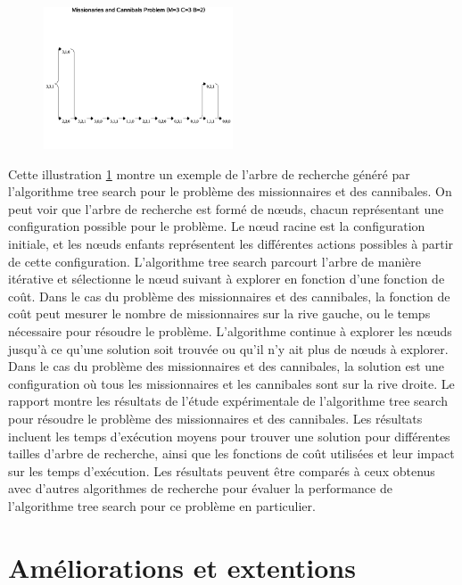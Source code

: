 \documentclass{article}
\begin{document}
\begin{figure}[h]
\centering
\includegraphics[width=0.5\textwidth]{tree_search_example.png}
\label{fig:tree_search_example}
\end{figure}

\noindent Cette illustration \ref{fig:tree_search_example} montre un exemple de l'arbre de recherche généré par l'algorithme tree search pour le problème des missionnaires et des cannibales. On peut voir que l'arbre de recherche est formé de nœuds, chacun représentant une configuration possible pour le problème. Le nœud racine est la configuration initiale, et les nœuds enfants représentent les différentes actions possibles à partir de cette configuration.
L'algorithme tree search parcourt l'arbre de manière itérative et sélectionne le nœud suivant à explorer en fonction d'une fonction de coût. Dans le cas du problème des missionnaires et des cannibales, la fonction de coût peut mesurer le nombre de missionnaires sur la rive gauche, ou le temps nécessaire pour résoudre le problème.
L'algorithme continue à explorer les nœuds jusqu'à ce qu'une solution soit trouvée ou qu'il n'y ait plus de nœuds à explorer. Dans le cas du problème des missionnaires et des cannibales, la solution est une configuration où tous les missionnaires et les cannibales sont sur la rive droite.
Le rapport montre les résultats de l'étude expérimentale de l'algorithme tree search pour résoudre le problème des missionnaires et des cannibales. Les résultats incluent les temps d'exécution moyens pour trouver une solution pour différentes tailles d'arbre de recherche, ainsi que les fonctions de coût utilisées et leur impact sur les temps d'exécution. Les résultats peuvent être comparés à ceux obtenus avec d'autres algorithmes de recherche pour évaluer la performance de l'algorithme tree search pour ce problème en particulier.

\section{Améliorations et extentions}
\end{document}
